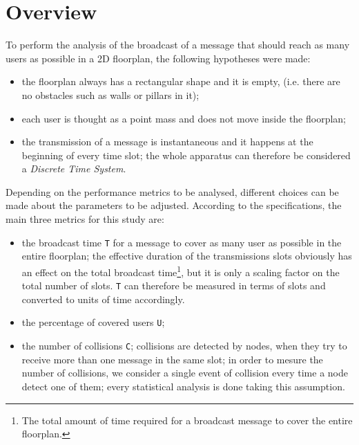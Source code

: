 %
\chapter{Overview}\label{overview}
To perform the analysis of the broadcast of a message that should reach as many
users as possible in a 2D floorplan, the following hypotheses were made:
\begin{itemize}
	\item the floorplan always has a rectangular shape and it is empty, (i.e.
	there are no obstacles such as walls or pillars in it);
	\item each user is thought as a point mass and does not move inside the
	floorplan;
	\item the transmission of a message is instantaneous and it happens at the
	beginning of every time slot; the whole apparatus can therefore be
	considered a \textit{Discrete Time System}.
\end{itemize}
Depending on the performance metrics to be analysed, different choices can be
made about the parameters to be adjusted. According to the specifications, the
main three metrics for this study are:
\begin{itemize}
	\item the broadcast time \colorbox{gray!30}{\large \texttt{T}} for a message
	to cover as many user as possible in the entire floorplan; the effective duration 
	of the transmissions slots obviously has an effect
	on the total broadcast time\footnote{The total amount of time required for a
	broadcast message to cover the entire floorplan.}, but it is only a scaling
	factor on the total number of slots. \texttt{T} can therefore be measured in
	terms of slots and converted to units of time accordingly.
	\item the percentage of covered users \colorbox{gray!30}{\large \texttt{U}};
	\item the number of collisions \colorbox{gray!30}{\large \texttt{C}}; collisions
	are detected by nodes, when they try to receive more than one message in the same slot;
	in order to mesure the number of collisions, we consider a single event of collision
	every time a node detect one of them; every statistical analysis is done taking this
	assumption.
\end{itemize}

